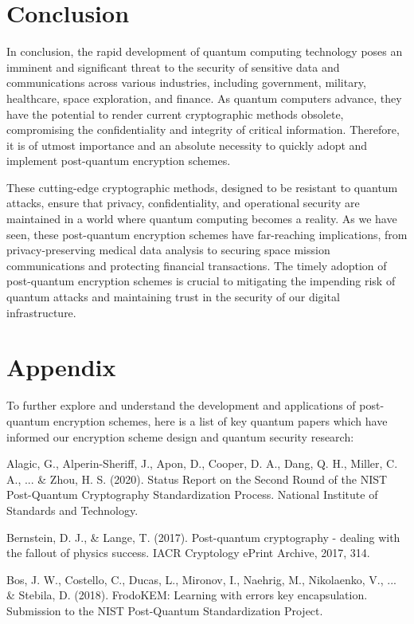 \documentclass[11pt]{article}
\begin{document}
\section{Conclusion}

In conclusion, the rapid development of quantum computing technology poses an imminent and significant threat to the security of sensitive data and communications across various industries, including government, military, healthcare, space exploration, and finance. As quantum computers advance, they have the potential to render current cryptographic methods obsolete, compromising the confidentiality and integrity of critical information. Therefore, it is of utmost importance and an absolute necessity to quickly adopt and implement post-quantum encryption schemes.


These cutting-edge cryptographic methods, designed to be resistant to quantum attacks, ensure that privacy, confidentiality, and operational security are maintained in a world where quantum computing becomes a reality. As we have seen, these post-quantum encryption schemes have far-reaching implications, from privacy-preserving medical data analysis to securing space mission communications and protecting financial transactions. The timely adoption of post-quantum encryption schemes is crucial to mitigating the impending risk of quantum attacks and maintaining trust in the security of our digital infrastructure.


\section{Appendix}

To further explore and understand the development and applications of post-quantum encryption schemes, here is a list of key quantum papers which have informed our encryption scheme design and quantum security research:


Alagic, G., Alperin-Sheriff, J., Apon, D., Cooper, D. A., Dang, Q. H., Miller, C. A., ... \& Zhou, H. S. (2020). Status Report on the Second Round of the NIST Post-Quantum Cryptography Standardization Process. National Institute of Standards and Technology.


Bernstein, D. J., \& Lange, T. (2017). Post-quantum cryptography - dealing with the fallout of physics success. IACR Cryptology ePrint Archive, 2017, 314.


Bos, J. W., Costello, C., Ducas, L., Mironov, I., Naehrig, M., Nikolaenko, V., ... \& Stebila, D. (2018). FrodoKEM: Learning with errors key encapsulation. Submission to the NIST Post-Quantum Standardization Project.
\end{document}
